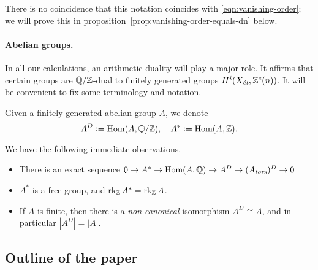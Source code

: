 \documentclass{article}
\numberwithin{equation}{section}
\begin{document}
There is no coincidence that this notation coincides with
\eqref{eqn:vanishing-order}; we will prove this
in proposition~\ref{prop:vanishing-order-equals-dn} below.

\paragraph{Abelian groups.}
In all our calculations, an arithmetic duality
\cite[Theorem~I]{Beshenov-Weil-etale-1} will play a major role. It affirms that
certain groups are $\QQ/\ZZ$-dual to finitely generated groups
$H^i (X_\et, \ZZ^c(n))$. It will be convenient to fix some terminology and
notation.

\begin{definition}
  \label{dfn:A-D-and-A-star}
  Given a finitely generated abelian group $A$, we denote
  \[ A^D \dfn \Hom (A, \QQ/\ZZ), \quad
    A^* \dfn \Hom (A, \ZZ). \]
\end{definition}

\begin{remark}
  \label{rmk:A-D-and-A-star}
  We have the following immediate observations.
  \begin{itemize}
  \item There is an exact sequence
    $0 \to A^* \to \Hom (A,\QQ) \to A^D \to (A_\tors)^D \to 0$

  \item $A^*$ is a free group, and $\rk_\ZZ A^* = \rk_\ZZ A$.

  \item If $A$ is finite, then there is a \emph{non-canonical} isomorphism
    $A^D \cong A$, and in particular $|A^D| = |A|$.
  \end{itemize}
\end{remark}



\subsection*{Outline of the paper}
\end{document}
